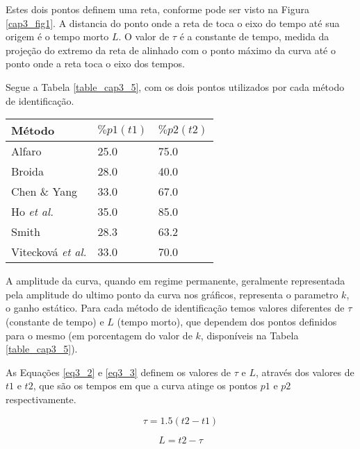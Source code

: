     Estes dois pontos definem uma reta, conforme pode ser visto na Figura
    \ref{cap3_fig1}. A distancia do ponto onde a reta de toca o eixo do tempo
    até sua origem é o tempo morto $L$. O valor de $\tau$ é a constante de
    tempo, medida da projeção do extremo da reta de alinhado com o ponto
    máximo da curva até o ponto onde a reta toca o eixo dos tempos.
    
    Segue a Tabela \ref{table_cap3_5}, com os dois pontos utilizados por cada
    método de identificação.
    
    \begin{center}
        \begin{tabular}{l l l}
        \label{table_cap3_5}
Método & $\%p1(t1)$ & $\%p2(t2)$ \\
\hline
Alfaro                    & 25.0 & 75.0 \\
Broida                    & 28.0 & 40.0 \\
Chen \& Yang              & 33.0 & 67.0 \\
Ho \textit{et al.}        & 35.0 & 85.0 \\
Smith                     & 28.3 & 63.2 \\
Vitecková \textit{et al.} & 33.0 & 70.0 \\
        \end{tabular}
    \end{center}
    
    A amplitude da curva, quando em regime permanente, geralmente representada pela amplitude
    do ultimo ponto da curva nos gráficos, representa o parametro $k$, o ganho
    estático. Para cada método de identificação temos valores diferentes de $\tau$ (constante de
    tempo) e $L$ (tempo morto), que dependem dos pontos definidos para o mesmo
    (em porcentagem do valor de $k$, disponíveis na Tabela \ref{table_cap3_5}).
    
    As Equações \ref{eq3_2} e \ref{eq3_3} definem os valores de $\tau$ e $L$,
    através dos valores de $t1$ e $t2$, que são os tempos em que a curva atinge
    os pontos $p1$ e $p2$ respectivamente.
    
    \begin{equation}
        \tau = 1.5(t2 - t1)
        \label{eq3_2}
    \end{equation}
    
    \begin{equation}
        L = t2 - \tau
        \label{eq3_3}
    \end{equation}
    
